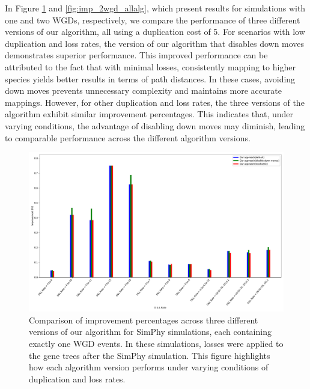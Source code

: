 \documentclass[10pt]{article}
\begin{document}
In Figure \ref{fig:imp_1wgd_allalg} and \ref{fig:imp_2wgd_allalg}, which present results for simulations with one and two WGDs, respectively, we compare the performance of three different versions of our algorithm, all using a duplication cost of 5. For scenarios with low duplication and loss rates, the version of our algorithm that disables down moves demonstrates superior performance. This improved performance can be attributed to the fact that with minimal losses, consistently mapping to higher species yields better results in terms of path distances. In these cases, avoiding down moves prevents unnecessary complexity and maintains more accurate mappings. However, for other duplication and loss rates, the three versions of the algorithm exhibit similar improvement percentages. This indicates that, under varying conditions, the advantage of disabling down moves may diminish, leading to comparable performance across the different algorithm versions.


\begin{figure}[hbt!]
    \centering
    \includegraphics[width=1\textwidth]{figs_theory/imp_1WGD_allalgo_d5.pdf}
    \caption{Comparison of improvement percentages across three different versions of our algorithm for SimPhy simulations, each containing exactly one WGD events. In these simulations, losses were applied to the gene trees after the SimPhy simulation. This figure highlights how each algorithm version performs under varying conditions of duplication and loss rates.}
    \label{fig:imp_1wgd_allalg}
\end{figure}
\end{document}
